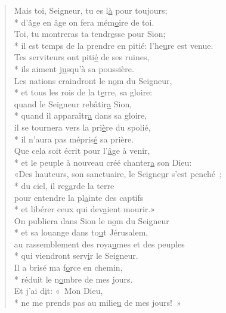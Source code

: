 \begin{verse}
Mais toi, Seigneur, tu es l\underline{à} pour toujours; \\*
d’âge en âge on fera mém\underline{o}ire de toi. \\
Toi, tu montreras ta tendr\underline{e}sse pour Sion; \\*
il est temps de la prendre en pitié: l’he\underline{u}re est venue. \\
Tes serviteurs ont piti\underline{é} de ses ruines, \\*
ils aiment j\underline{u}squ’à sa poussière. \\

Les nations craindront le n\underline{o}m du Seigneur, \\*
et tous les rois de la t\underline{e}rre, sa gloire: \\
quand le Seigneur rebâtir\underline{a} Sion, \\*
quand il apparaîtr\underline{a} dans sa gloire, \\
il se tournera vers la pri\underline{è}re du spolié, \\*
il n’aura pas mépris\underline{é} sa prière. \\

Que cela soit écrit pour l’\underline{â}ge à venir, \\*
et le peuple à nouveau créé chanter\underline{a} son Dieu: \\
«Des hauteurs, son sanctuaire, le Seigne\underline{u}r s’est penché ; \\*
du ciel, il reg\underline{a}rde la terre \\
pour entendre la pl\underline{a}inte des captifs \\*
et libérer ceux qui dev\underline{a}ient mourir.» \\

On publiera dans Sion le n\underline{o}m du Seigneur \\*
et sa louange dans to\underline{u}t Jérusalem, \\
au rassemblement des roya\underline{u}mes et des peuples \\*
qui viendront serv\underline{i}r le Seigneur. \\

Il a brisé ma f\underline{o}rce en chemin, \\*
réduit le n\underline{o}mbre de mes jours. \\
Et j’ai d\underline{i}t: « Mon Dieu, \\*
ne me prends pas au milie\underline{u} de mes jours! » \\


\end{verse}
